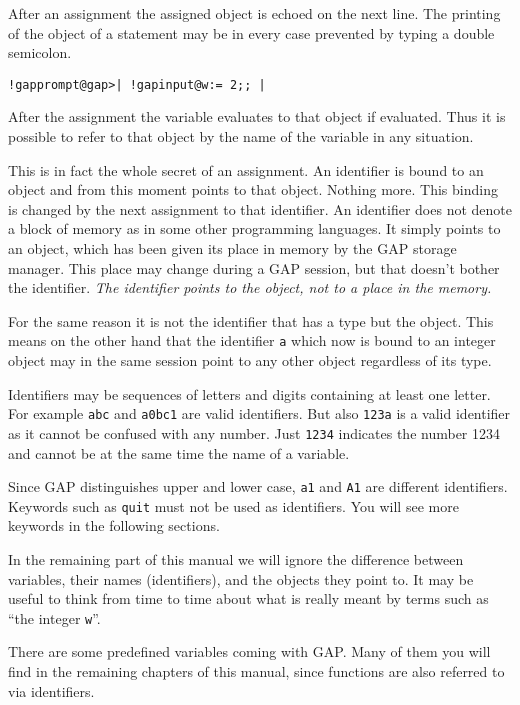 \documentclass[a4paper,11pt]{report}
\begin{document}
{{ After an assignment the assigned object is echoed on the next line. The
printing of the object of a statement may be in every case prevented by typing
a double semicolon. 

 
\begin{Verbatim}[commandchars=!@|,fontsize=\small,frame=single,label=Example]
  !gapprompt@gap>| !gapinput@w:= 2;; |
\end{Verbatim}
 

 After the assignment the variable evaluates to that object if evaluated. Thus
it is possible to refer to that object by the name of the variable in any
situation. 

 This is in fact the whole secret of an assignment. An identifier is bound to
an object and from this moment points to that object. Nothing more. This
binding is changed by the next assignment to that identifier. An identifier
does not denote a block of memory as in some other programming languages. It
simply points to an object, which has been given its place in memory by the \textsf{GAP} storage manager. This place may change during a \textsf{GAP} session, but that doesn't bother the identifier. \emph{The identifier points to the object, not to a place in the memory.} 

 For the same reason it is not the identifier that has a type but the object.
This means on the other hand that the identifier \texttt{a} which now is bound to an integer object may in the same session point to any
other object regardless of its type. 

 Identifiers may be sequences of letters and digits containing at least one
letter. For example \texttt{abc} and \texttt{a0bc1} are valid identifiers. But also \texttt{123a} is a valid identifier as it cannot be confused with any number. Just \texttt{1234} indicates the number 1234 and cannot be at the same time the name of a
variable. 

 Since \textsf{GAP} distinguishes upper and lower case, \texttt{a1} and \texttt{A1} are different identifiers. Keywords such as \texttt{quit} must not be used as identifiers. You will see more keywords in the following
sections. 

 In the remaining part of this manual we will ignore the difference between
variables, their names (identifiers), and the objects they point to. It may be
useful to think from time to time about what is really meant by terms such as ``the integer \texttt{w}''. 

 There are some predefined variables coming with \textsf{GAP}. Many of them you will find in the remaining chapters of this manual, since
functions are also referred to via identifiers. 

}}
\end{document}
